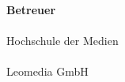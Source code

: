 \begin{titlepage}
\begin{center}
\vspace{1cm}

\large{\textbf{Betreuer}}\\
\vspace{0.2cm}
\supervisor\\
\normalsize{Hochschule der Medien}\\
\vspace{0.2cm}
\large{\advisor}\\
\normalsize{Leomedia GmbH}


\end{center}
\end{titlepage}
\vfill